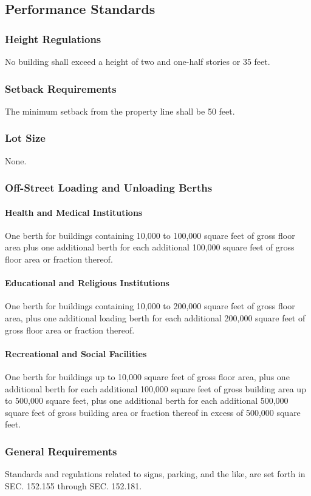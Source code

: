 \subsection{Performance Standards}
\subsubsection{Height Regulations}
No building shall exceed a height of two and one-half stories or 35 feet.
\subsubsection{Setback Requirements}
The minimum setback from the property line shall be 50 feet.
\subsubsection{Lot Size}
None.
\subsubsection{Off-Street Loading and Unloading Berths}
\paragraph{Health and Medical Institutions}
One berth for buildings containing 10,000 to 100,000 square feet of gross floor area plus one additional berth for each additional 100,000 square feet of gross floor area or fraction thereof.
\paragraph{Educational and Religious Institutions}
One berth for buildings containing 10,000 to 200,000 square feet of gross floor area, plus one additional loading berth for each additional 200,000 square feet of gross floor area or fraction thereof.
\paragraph{Recreational and Social Facilities}
One berth for buildings up to 10,000 square feet of gross floor area, plus one additional berth for each additional 100,000 square feet of gross building area up to 500,000 square feet, plus one additional berth for each additional 500,000 square feet of gross building area or fraction thereof in excess of 500,000 square feet.
\subsubsection{General Requirements}
Standards and regulations related to signs, parking, and the like, are set forth in SEC. 152.155 through SEC. 152.181.

